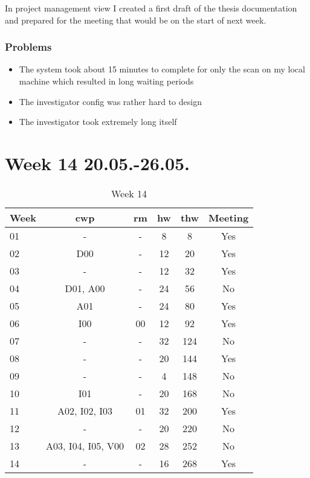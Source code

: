 In project management view I created a first draft of the thesis documentation and prepared for the meeting that would be on the start of next week.

\subsubsection{Problems}

\begin{itemize}
    \item The system took about 15 minutes to complete for only the scan on my local machine which resulted in long waiting periods
    \item The investigator config was rather hard to design
    \item The investigator took extremely long itself
\end{itemize}

\section{Week 14 20.05.-26.05.}
\label{sec:journal:week14}

\begin{table}[!ht]
    \begin{center}
        \caption{Week 14}
        \label{tab:journal:week14}
        \begin{tabular}{l|c|c|c|c|c}
            \textbf{Week} & \textbf{\gls{cwp}} & \textbf{\gls{rm}} & \textbf{\gls{hw}} & \textbf{\gls{thw}} & \textbf{Meeting}\\
        \hline
        01 & - & - & 8 & 8 & Yes \\
        02 & D00 & - & 12 & 20 & Yes \\
        03 & - & - & 12 & 32 & Yes \\
        04 & D01, A00 & - & 24 & 56 & No \\
        05 & A01 & - & 24 & 80 & Yes \\
        06 & I00 & 00 & 12 & 92 & Yes \\
        07 & - & - & 32 & 124 & No \\
        08 & - & - & 20 & 144 & Yes \\
        09 & - & - & 4 & 148 & No \\
        10 & I01 & - & 20 & 168 & No \\
        11 & A02, I02, I03 & 01 & 32 & 200 & Yes \\
        12 & - & - & 20 & 220 & No \\
        13 & A03, I04, I05, V00 & 02 & 28 & 252 & No \\
        14 & - & - & 16 & 268 & Yes \\
        \end{tabular}
    \end{center}
\end{table}

